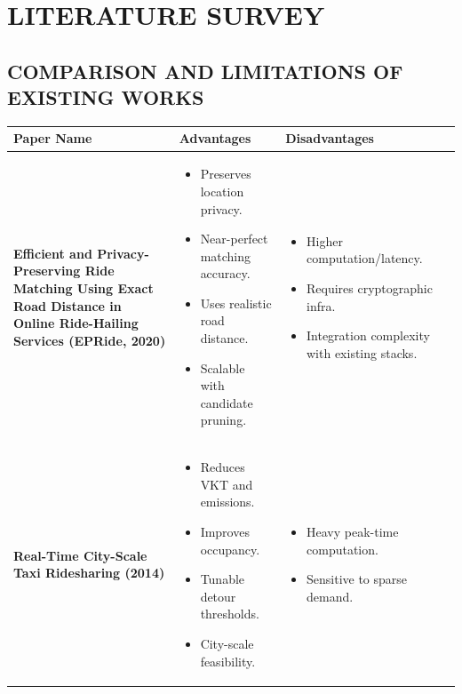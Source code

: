 \documentclass[10pt,a4paper]{report}
\begin{document}
\newpage

\chapter{LITERATURE SURVEY}
\section{\textbf{COMPARISON AND LIMITATIONS OF EXISTING WORKS}}


\begin{table}[h!]
\centering
\renewcommand{\arraystretch}{1} %
\fontsize{9.3}{8.5}\selectfont%
\setlength{\tabcolsep}{3pt} %
\begin{tabular}{|p{3.5cm}|p{4cm}|p{4cm}|p{4.2cm}|}
\hline
\textbf{Paper Name}  & \textbf{Advantages} & \textbf{Disadvantages} \\ \hline
\textbf{Efficient and Privacy-Preserving Ride Matching Using Exact Road Distance in Online Ride-Hailing Services (EPRide, 2020)}
 &
\begin{itemize}[leftmargin=*,nosep]
\item Preserves location privacy.
\item Near-perfect matching accuracy.
\item Uses realistic road distance.
\item Scalable with candidate pruning.
\end{itemize} &
\begin{itemize}[leftmargin=*,nosep]
\item Higher computation/latency.
\item Requires cryptographic infra.
\item Integration complexity with existing stacks.
\end{itemize} \\ \hline
\textbf{Real-Time City-Scale Taxi Ridesharing (2014)} &
\begin{itemize}[leftmargin=*,nosep]
\item Reduces VKT and emissions.
\item Improves occupancy.
\item Tunable detour thresholds.
\item City-scale feasibility.
\end{itemize} &
\begin{itemize}[leftmargin=*,nosep]
\item Heavy peak-time computation.
\item Sensitive to sparse demand.

\end{itemize}
\end{tabular}
\end{table}
\end{document}
